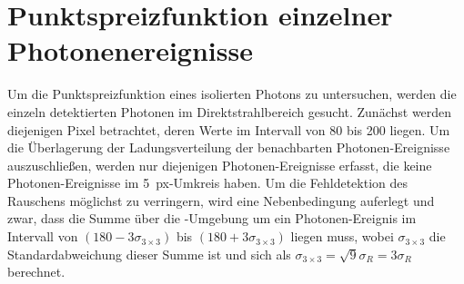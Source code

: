 \section{Punktspreizfunktion einzelner Photonenereignisse}
\label{text:punktspreizfunktion}
Um die Punktspreizfunktion eines isolierten Photons zu untersuchen, werden die einzeln detektierten Photonen im  Direktstrahlbereich gesucht. Zunächst werden diejenigen Pixel betrachtet, deren Werte im Intervall von \SI{80}{\adu} bis \SI{200}{\adu} liegen. Um die Überlagerung der Ladungsverteilung der benachbarten Photonen-Ereignisse auszuschließen, werden nur diejenigen Photonen-Ereignisse erfasst, die keine Photonen-Ereignisse im \SI{5}{px}-Umkreis haben. Um die Fehldetektion des Rauschens möglichst zu verringern, wird eine Nebenbedingung auferlegt und zwar, dass die Summe über die -Umgebung um ein  Photonen-Ereignis im Intervall von $(180-3\sigma_{3\times 3})$ \si{\adu} bis $(180+3\sigma_{3\times 3})$ \si{\adu} liegen muss, wobei $\sigma_{3\times 3}$ die Standardabweichung dieser Summe ist und sich als $\sigma_{3\times 3} = \sqrt{9}\sigma_R = 3 \sigma_R$ berechnet.

